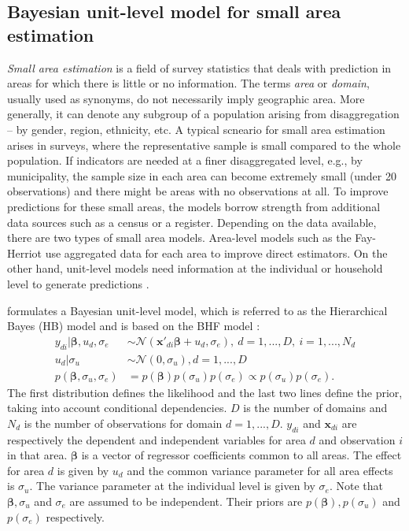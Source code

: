 \subsection{Bayesian unit-level model for small area estimation}

\textit{Small area estimation} is a field of survey statistics that deals with prediction in areas for which there is little or no information.
The terms \textit{area} or \textit{domain}, usually used as synonyms, do not necessarily imply geographic area.
More generally, it can denote any subgroup of a population arising from disaggregation – by gender, region, ethnicity, etc.
A typical scneario for small area estimation arises in surveys, where the representative sample is small compared to the whole population.
If indicators are needed at a finer disaggregated level, e.g., by municipality, the sample size in each area can become extremely small (under 20 observations) and there might be areas with no observations at all.
To improve predictions for these small areas, the models borrow strength from additional data sources such as a census or a register.
Depending on the data available, there are two types of small area models.
Area-level models such as the Fay-Herriot use aggregated data for each area to improve direct estimators.
On the other hand, unit-level models need information at the individual or household level to generate predictions \citep[Chapter 1 and 2]{rao_small_2015}.

\cite{molina_small_2014} formulates a Bayesian unit-level model, which is referred to as the Hierarchical Bayes (HB) model and is based on the BHF model \citep{battese_error_1988}:
\begin{equation}
    \label{eq:hb_rao}
	\begin{split}
	y_{di} |\boldsymbol \beta, u_d, \sigma_e & \sim \mathcal N(\boldsymbol{x'}_{di} \boldsymbol{\beta}+ u_d, \sigma_e), ~ d = 1, ..., D, ~ i = 1, ..., N_d \\
	u_d | \sigma_u & \sim \mathcal N(0, \sigma_u), d = 1, ..., D \\
	p(\boldsymbol \beta, \sigma_u, \sigma_e) & = p(\boldsymbol \beta) p(\sigma_u)p(\sigma_e) \propto p(\sigma_u)p(\sigma_e).
	\end{split}
\end{equation}
The first distribution defines the likelihood and the last two lines define the prior, taking into account conditional dependencies.
$D$ is the number of domains and $N_d$ is the number of observations for domain $d = 1, ..., D$. $y_{di}$ and $\boldsymbol{x}_{di}$ are respectively the dependent and independent variables for area $d$ and observation $i$ in that area.
$\boldsymbol \beta$ is a vector of regressor coefficients common to all areas.
The effect for area $d$ is given by $u_d$ and the common variance parameter for all area effects is $\sigma_u$.
The variance parameter at the individual level is given by $\sigma_e$.
Note that $\boldsymbol \beta, \sigma_u$ and $\sigma_e$ are assumed to be independent.
Their priors are $p(\boldsymbol \beta), p(\sigma_u)$ and $p(\sigma_e)$ respectively.

